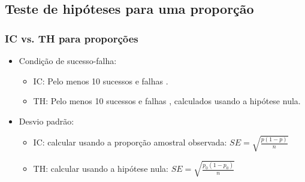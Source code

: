 
\subsection{Teste de hipóteses para uma proporção}


\begin{frame}
\frametitle{IC vs. TH para proporções}

\begin{itemize}

\item Condição de sucesso-falha:
\begin{itemize}
\item IC: Pelo menos 10 sucessos e falhas . 
\item TH: Pelo menos 10 sucessos e falhas , calculados usando a hipótese nula.
\end{itemize}

\item Desvio padrão:
\begin{itemize}
\item IC: calcular usando a proporção amostral observada: $SE = \sqrt{\frac{p(1-p)}{n}}$
\item TH: calcular usando a hipótese nula: $SE = \sqrt{\frac{p_0(1-p_0)}{n}}$
\end{itemize}

\end{itemize}

\end{frame}


